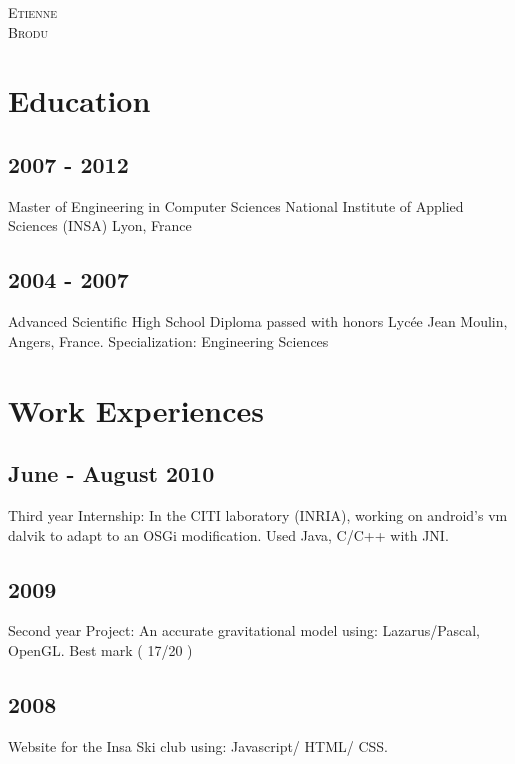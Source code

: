 


\pagestyle{empty}

	{
		\LARGE{\textsc{Etienne}\\
				\textsc{Brodu}}
	}
	
	
	
\section{Education}
	\subsection{2007 - 2012}
		{Master of Engineering in Computer Sciences National Institute of Applied Sciences (INSA) Lyon, France}
		
	\subsection{2004 - 2007}
		{Advanced Scientific High School Diploma passed with honors Lyc\'{e}e Jean Moulin, Angers, France. Specialization: Engineering Sciences}

\section{Work Experiences}
	\subsection{June - August 2010}
		{Third year Internship: In the CITI laboratory (INRIA), working on android's vm dalvik to adapt to an OSGi modification. Used Java, C/C++ with JNI.}

	\subsection{2009}
		{Second year Project: An accurate gravitational model using: Lazarus/Pascal, OpenGL. Best mark ( 17/20 )}
		
	\subsection{2008}
		{Website for the Insa Ski club using: Javascript/ HTML/ CSS.}
				
